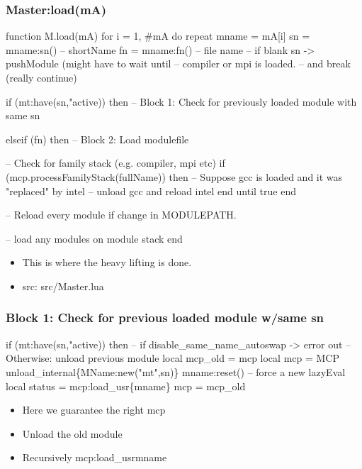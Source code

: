 \documentclass{beamer}
\begin{document}
\begin{frame}[fragile]
    \frametitle{Master:load(mA)}
 {\tiny
    \begin{semiverbatim}
function M.load(mA)
  for i = 1, #mA do
     repeat
        mname = mA[i]
        sn = mname:sn()  -- shortName
        fn = mname:fn()  -- file name
        -- if blank sn -> pushModule (might have to wait until
        -- compiler or mpi is loaded.
        -- and break (really continue)

        if (mt:have(sn,"active)) then
           -- Block 1: Check for previously loaded module with same sn

        elseif (fn) then
           -- Block 2: Load modulefile

        -- Check for family stack (e.g. compiler, mpi etc)
        if (mcp.processFamilyStack(fullName)) then
            -- Suppose gcc is loaded and it was "replaced" by intel
            -- unload gcc and reload intel
         end
      until true
   end         
     
   -- Reload every module if change in MODULEPATH.
     
   -- load any modules on module stack
end
    \end{semiverbatim}
}
  \begin{itemize}
    \item This is where the heavy lifting is done.
    \item src: src/Master.lua
  \end{itemize}

\end{frame}

\begin{frame}[fragile]
    \frametitle{Block 1: Check for previous loaded module w/same sn}
 {\tiny
    \begin{semiverbatim}
 if (mt:have(sn,"active)) then
    -- if disable_same_name_autoswap -> error out
    -- Otherwise: unload previous module
     local mcp_old = mcp
     local mcp     = MCP
     unload_internal\{MName:new("mt",sn)\}
     mname:reset()  -- force a new lazyEval
     local status = mcp:load_usr\{mname\}
     mcp          = mcp_old
    \end{semiverbatim}
}
  \begin{itemize}
    \item Here we guarantee the right mcp
    \item Unload the old module 
    \item Recursively mcp:load\_usr{mname} 
  \end{itemize}
\end{frame}
\end{document}
